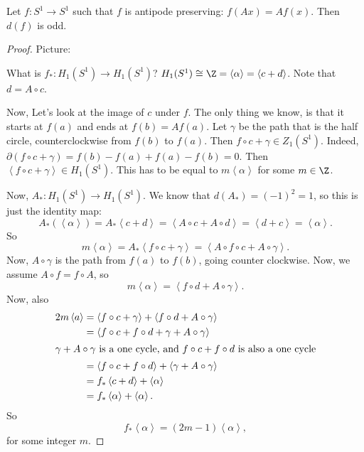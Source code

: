 
\begin{theorem}
    Let $f: S^1 \to S^{1}$ such that $f$ is antipode preserving: $f(A x) = Af(x)$.
    Then $d(f)$ is odd.
\end{theorem}
\begin{proof}
    Picture:
\begin{figure}[H]
    \centering
    \label{fig:antipode-preserving-maps}
\end{figure}
What is $f_*: H_1(S^{1}) \to  H_1(S^{1})$?
$H_1(S^{1}) \cong \Z = \left<\alpha \right> = \left< c + d \right>$.
Note that $d = A  \circ c$.

Now, Let's look at the image of $c$ under  $f$.
The only thing we know, is that it starts at $f(a)$ and ends at $f(b) = A f(a)$.
Let  $\gamma$ be the path that is the half circle, counterclockwise from $f(b)$ to $f(a)$.
Then $f  \circ  c + \gamma \in Z_1(S^{1})$.
Indeed, $\partial(f  \circ  c + \gamma) = f(b) - f(a) + f(a) - f(b) = 0$.
Then $\left<f  \circ  c + \gamma \right> \in H_1(S^{1})$.
This has to be equal to $m \left<\alpha \right>$ for some $m \in \Z$.

Now, $A_*: H_1(S^{1}) \to  H_1(S^{1})$.
We know that $d(A_*) = (-1)^{2} = 1$, so this is just the identity map:
\[
    A_*(\left<\alpha \right>) = A_* \left<c + d \right> = \left<A  \circ  c + A  \circ  d \right> = \left<d + c \right> = \left<\alpha \right>
.\] 
So \[
m \left<\alpha \right> = A_* \left<f  \circ  c + \gamma \right>
= \left<A  \circ  f  \circ  c + A  \circ  \gamma \right>
.\]
Now, $A  \circ  \gamma$ is the path from $f(a)$ to $f(b)$, going counter clockwise. Now, we assume $A  \circ  f = f  \circ  A$, so
\[
m \left<\alpha \right> = \left<f  \circ  d + A  \circ  \gamma \right>
.\] 
Now, also
\begin{align*}
    2 m \left<a \right> &= \left<f  \circ  c + \gamma \right> + \left< f  \circ  d + A  \circ  \gamma \right>\\
                        &= \left<f  \circ  c + f  \circ  d + \gamma + A  \circ  \gamma \right>\\
                        \intertext{$\gamma + A  \circ  \gamma$ is a one cycle, and $f  \circ  c + f  \circ  d$ is also a one cycle}
                        &= \left<f  \circ  c + f  \circ  d \right> + \left<\gamma + A  \circ  \gamma \right>\\
                        &= f_* \left< c + d \right> + \left< \alpha \right>\\
                        &= f_* \left< \alpha \right> + \left<\alpha \right>
.\end{align*} 
So
\[
    f_* \left<\alpha \right> = (2m - 1) \left<\alpha \right>
,\] 
for some integer $m$.
\end{proof}

